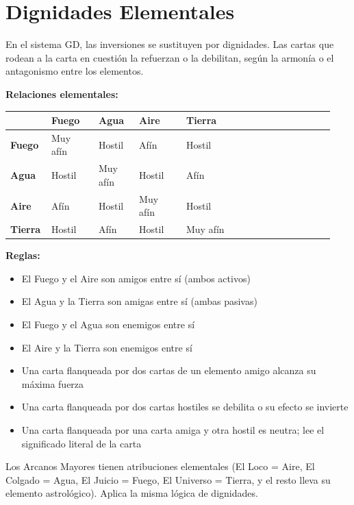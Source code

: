 \section{Dignidades Elementales}\label{elemental-dignities}

En el sistema GD, las inversiones se sustituyen por dignidades. Las cartas que rodean a la carta en cuestión la refuerzan o la debilitan, según la armonía o el antagonismo entre los elementos.

\textbf{Relaciones elementales:}

\begin{longtable}[]{@{}>{\RaggedRight\small}p{0.10\linewidth}>{\RaggedRight\small}p{0.14\linewidth}>{\RaggedRight\small}p{0.12\linewidth}>{\RaggedRight\small}p{0.14\linewidth}>{\RaggedRight\small}p{0.44\linewidth}@{}}
\toprule\noalign{}
& Fuego & Agua & Aire & Tierra \\
\midrule\noalign{}
\endhead
\bottomrule\noalign{}
\endlastfoot
\textbf{Fuego} & Muy afín & Hostil & Afín & Hostil \\
\textbf{Agua} & Hostil & Muy afín & Hostil & Afín \\
\textbf{Aire} & Afín & Hostil & Muy afín & Hostil \\
\textbf{Tierra} & Hostil & Afín & Hostil & Muy afín \\
\end{longtable}

\textbf{Reglas:}

\begin{itemize}
\tightlist
\item
  El Fuego y el Aire son amigos entre sí (ambos activos)
\item
  El Agua y la Tierra son amigas entre sí (ambas pasivas)
\item
  El Fuego y el Agua son enemigos entre sí
\item
  El Aire y la Tierra son enemigos entre sí
\item
  Una carta flanqueada por dos cartas de un elemento amigo alcanza su máxima fuerza
\item
  Una carta flanqueada por dos cartas hostiles se debilita o su efecto se invierte
\item
  Una carta flanqueada por una carta amiga y otra hostil es neutra; lee el significado literal de la carta
\end{itemize}

Los Arcanos Mayores tienen atribuciones elementales (El Loco = Aire, El Colgado = Agua, El Juicio = Fuego, El Universo = Tierra, y el resto lleva su elemento astrológico). Aplica la misma lógica de dignidades.

